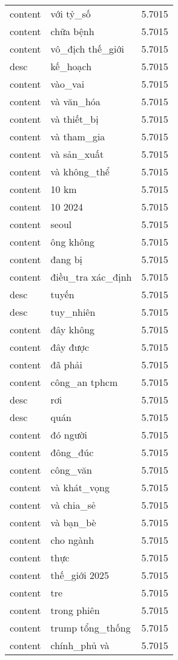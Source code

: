 \documentclass{article}
\begin{document}
\begin{tabular}{lll}
content & với tỷ\_số & 5.7015\\
content & chữa bệnh & 5.7015\\
content & vô\_địch thế\_giới & 5.7015\\
desc & kế\_hoạch & 5.7015\\
content & vào\_vai & 5.7015\\
content & và văn\_hóa & 5.7015\\
content & và thiết\_bị & 5.7015\\
content & và tham\_gia & 5.7015\\
content & và sản\_xuất & 5.7015\\
content & và không\_thể & 5.7015\\
content & 10 km & 5.7015\\
content & 10 2024 & 5.7015\\
content & seoul & 5.7015\\
content & ông không & 5.7015\\
content & đang bị & 5.7015\\
content & điều\_tra xác\_định & 5.7015\\
desc & tuyến & 5.7015\\
desc & tuy\_nhiên & 5.7015\\
content & đây không & 5.7015\\
content & đây được & 5.7015\\
content & đã phải & 5.7015\\
content & công\_an tphcm & 5.7015\\
desc & rơi & 5.7015\\
desc & quán & 5.7015\\
content & đó người & 5.7015\\
content & đông\_đúc & 5.7015\\
content & công\_văn & 5.7015\\
content & và khát\_vọng & 5.7015\\
content & và chia\_sẻ & 5.7015\\
content & và bạn\_bè & 5.7015\\
content & cho ngành & 5.7015\\
content & thực & 5.7015\\
content & thế\_giới 2025 & 5.7015\\
content & tre & 5.7015\\
content & trong phiên & 5.7015\\
content & trump tổng\_thống & 5.7015\\
content & chính\_phủ và & 5.7015\\

\end{tabular}
\end{document}
